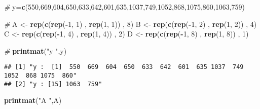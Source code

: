 \documentclass[]{article}
\newenvironment{Shaded}{\begin{snugshade}}{\end{snugshade}}
\newcommand{\CommentTok}[1]{\textcolor[rgb]{0.56,0.35,0.01}{\textit{#1}}}
\newcommand{\DecValTok}[1]{\textcolor[rgb]{0.00,0.00,0.81}{#1}}
\newcommand{\KeywordTok}[1]{\textcolor[rgb]{0.13,0.29,0.53}{\textbf{#1}}}
\newcommand{\NormalTok}[1]{#1}
\newcommand{\OperatorTok}[1]{\textcolor[rgb]{0.81,0.36,0.00}{\textbf{#1}}}
\newcommand{\StringTok}[1]{\textcolor[rgb]{0.31,0.60,0.02}{#1}}
\begin{document}
\begin{Shaded}
\begin{Highlighting}[]
\CommentTok{#}
\NormalTok{y=}\KeywordTok{c}\NormalTok{(}\DecValTok{550}\NormalTok{,}\DecValTok{669}\NormalTok{,}\DecValTok{604}\NormalTok{,}\DecValTok{650}\NormalTok{,}\DecValTok{633}\NormalTok{,}\DecValTok{642}\NormalTok{,}\DecValTok{601}\NormalTok{,}\DecValTok{635}\NormalTok{,}\DecValTok{1037}\NormalTok{,}\DecValTok{749}\NormalTok{,}\DecValTok{1052}\NormalTok{,}\DecValTok{868}\NormalTok{,}\DecValTok{1075}\NormalTok{,}\DecValTok{860}\NormalTok{,}\DecValTok{1063}\NormalTok{,}\DecValTok{759}\NormalTok{)}

\CommentTok{#}
\NormalTok{A <-}\StringTok{ }\KeywordTok{rep}\NormalTok{(}\KeywordTok{c}\NormalTok{(}\KeywordTok{rep}\NormalTok{(}\OperatorTok{-}\DecValTok{1}\NormalTok{, }\DecValTok{1}\NormalTok{) , }\KeywordTok{rep}\NormalTok{(}\DecValTok{1}\NormalTok{, }\DecValTok{1}\NormalTok{)) , }\DecValTok{8}\NormalTok{)}
\NormalTok{B <-}\StringTok{ }\KeywordTok{rep}\NormalTok{(}\KeywordTok{c}\NormalTok{(}\KeywordTok{rep}\NormalTok{(}\OperatorTok{-}\DecValTok{1}\NormalTok{, }\DecValTok{2}\NormalTok{) , }\KeywordTok{rep}\NormalTok{(}\DecValTok{1}\NormalTok{, }\DecValTok{2}\NormalTok{)) , }\DecValTok{4}\NormalTok{)}
\NormalTok{C <-}\StringTok{ }\KeywordTok{rep}\NormalTok{(}\KeywordTok{c}\NormalTok{(}\KeywordTok{rep}\NormalTok{(}\OperatorTok{-}\DecValTok{1}\NormalTok{, }\DecValTok{4}\NormalTok{) , }\KeywordTok{rep}\NormalTok{(}\DecValTok{1}\NormalTok{, }\DecValTok{4}\NormalTok{)) , }\DecValTok{2}\NormalTok{)}
\NormalTok{D <-}\StringTok{ }\KeywordTok{rep}\NormalTok{(}\KeywordTok{c}\NormalTok{(}\KeywordTok{rep}\NormalTok{(}\OperatorTok{-}\DecValTok{1}\NormalTok{, }\DecValTok{8}\NormalTok{) , }\KeywordTok{rep}\NormalTok{(}\DecValTok{1}\NormalTok{, }\DecValTok{8}\NormalTok{)) , }\DecValTok{1}\NormalTok{)}

\CommentTok{#}
\KeywordTok{printmat}\NormalTok{(}\StringTok{"y "}\NormalTok{,y)}
\end{Highlighting}
\end{Shaded}

\begin{verbatim}
## [1] "y :  [1]  550  669  604  650  633  642  601  635 1037  749 1052  868 1075  860"
## [2] "y : [15] 1063  759"
\end{verbatim}

\begin{Shaded}
\begin{Highlighting}[]
\KeywordTok{printmat}\NormalTok{(}\StringTok{"A "}\NormalTok{,A)}
\end{Highlighting}
\end{Shaded}
\end{document}
